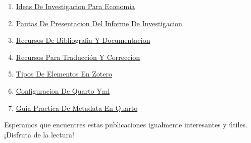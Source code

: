 \documentclass[
  doc,
  floatsintext,
  longtable,
  a4paper,
  nolmodern,
  notxfonts,
  notimes,
  12pt,
  colorlinks=true,linkcolor=blue,citecolor=blue,urlcolor=blue]{apa7}
\providecommand{\tightlist}{%
  \setlength{\itemsep}{0pt}\setlength{\parskip}{0pt}}
\begin{document}
\begin{enumerate}
\def\labelenumi{\arabic{enumi}.}
\tightlist
\item
  \href{https://methodica.netlify.app/posts/2023-06-03-ideas-de-investigacion-para-economia/index.pdf}{}
  \href{https://methodica.netlify.app/posts/2023-06-03-ideas-de-investigacion-para-economia}{Ideas
  De Investigacion Para Economia}
\item
  \href{https://methodica.netlify.app/posts/2023-06-03-pautas-de-presentacion-del-informe-de-investigacion/index.pdf}{}
  \href{https://methodica.netlify.app/posts/2023-06-03-pautas-de-presentacion-del-informe-de-investigacion}{Pautas
  De Presentacion Del Informe De Investigacion}
\item
  \href{https://methodica.netlify.app/posts/2025-01-12-recursos-de-bibliografia-y-documentacion/index.pdf}{}
  \href{https://methodica.netlify.app/posts/2025-01-12-recursos-de-bibliografia-y-documentacion}{Recursos
  De Bibliografia Y Documentacion}
\item
  \href{https://methodica.netlify.app/posts/2025-02-09-recursos-para-traducción-y-correccion/index.pdf}{}
  \href{https://methodica.netlify.app/posts/2025-02-09-recursos-para-traducción-y-correccion}{Recursos
  Para Traducción Y Correccion}
\item
  \href{https://methodica.netlify.app/posts/2025-04-23-tipos-de-elementos-en-zotero/index.pdf}{}
  \href{https://methodica.netlify.app/posts/2025-04-23-tipos-de-elementos-en-zotero}{Tipos
  De Elementos En Zotero}
\item
  \href{https://methodica.netlify.app/posts/2026-01-02-configuracion-de-quarto-yml/index.pdf}{}
  \href{https://methodica.netlify.app/posts/2026-01-02-configuracion-de-quarto-yml}{Configuracion
  De Quarto Yml}
\item
  \href{https://methodica.netlify.app/posts/2026-01-02-guia-practica-de-metadata-en-quarto/index.pdf}{}
  \href{https://methodica.netlify.app/posts/2026-01-02-guia-practica-de-metadata-en-quarto}{Guia
  Practica De Metadata En Quarto}
\end{enumerate}

Esperamos que encuentres estas publicaciones igualmente interesantes y
útiles. ¡Disfruta de la lectura!
\end{document}
